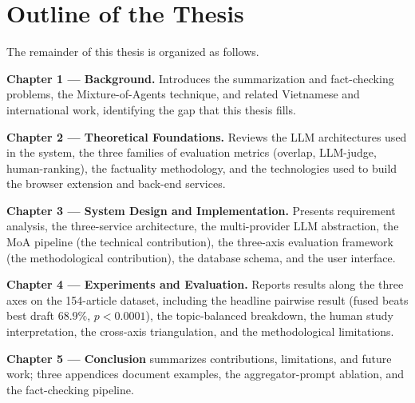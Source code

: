 \section*{Outline of the Thesis}

The remainder of this thesis is organized as follows.

\textbf{Chapter 1 --- Background.} Introduces the summarization and fact-checking
problems, the Mixture-of-Agents technique, and related Vietnamese and
international work, identifying the gap that this thesis fills.

\textbf{Chapter 2 --- Theoretical Foundations.} Reviews the LLM architectures used
in the system, the three families of evaluation metrics (overlap, LLM-judge,
human-ranking), the factuality methodology, and the technologies used to
build the browser extension and back-end services.

\textbf{Chapter 3 --- System Design and Implementation.} Presents requirement
analysis, the three-service architecture, the multi-provider LLM abstraction,
the MoA pipeline (the technical contribution), the three-axis evaluation
framework (the methodological contribution), the database schema, and the
user interface.

\textbf{Chapter 4 --- Experiments and Evaluation.} Reports results along the three
axes on the 154-article dataset, including the headline pairwise result
(fused beats best draft $68.9\%$, $p < 0.0001$), the topic-balanced
breakdown, the human study interpretation, the cross-axis triangulation, and
the methodological limitations.

\textbf{Chapter 5 --- Conclusion} summarizes contributions, limitations, and
future work; three appendices document examples, the aggregator-prompt ablation,
and the fact-checking pipeline.

